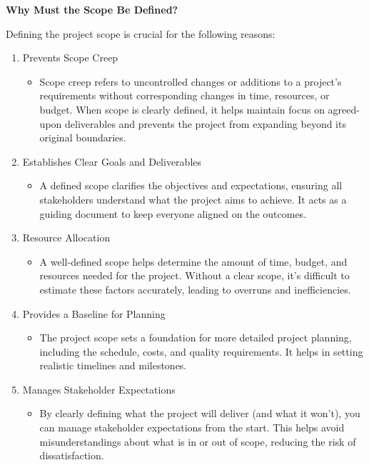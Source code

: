 \documentclass[a4paper]{article}
\begin{document}
\textbf{Why Must the Scope Be Defined?}
    
Defining the project scope is crucial for the following reasons:
\begin{enumerate}
    \item Prevents Scope Creep 
    \begin{itemize}
        \item Scope creep refers to uncontrolled changes or additions to a project’s requirements without 
            corresponding changes in time, resources, or budget. When scope is clearly defined, it helps maintain focus on agreed-upon
            deliverables and prevents the project from expanding beyond its original boundaries. 
    \end{itemize}
    \item Establishes Clear Goals and Deliverables 
    \begin{itemize}
        \item A defined scope clarifies the objectives and expectations, ensuring all stakeholders understand what the project aims to 
            achieve. It acts as a guiding document to keep everyone aligned on the outcomes.
    \end{itemize}
    \item Resource Allocation 
    \begin{itemize}
        \item A well-defined scope helps determine the amount of time, budget, and resources needed for 
            the project. Without a clear scope, it's difficult to estimate these factors accurately, leading to overruns and inefficiencies.
    \end{itemize}
    \item Provides a Baseline for Planning 
    \begin{itemize}
        \item The project scope sets a foundation for more detailed project planning, including the schedule, costs, and 
            quality requirements. It helps in setting realistic timelines and milestones.
    \end{itemize}
    \item Manages Stakeholder Expectations 
    \begin{itemize}
        \item By clearly defining what the project will deliver (and what it won’t), you can manage stakeholder expectations from the start. 
            This helps avoid misunderstandings about what is in or out of scope, reducing the risk of dissatisfaction.

\end{itemize}
\end{enumerate}
\end{document}
